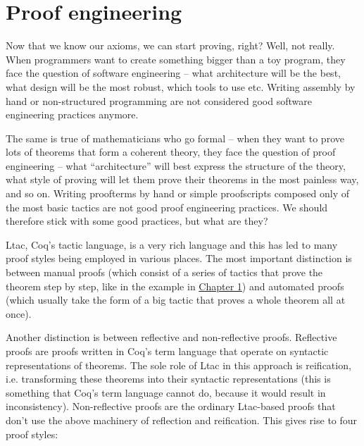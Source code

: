 \documentclass[declaration,inz,english,shortabstract]{iithesis}
\begin{document}
\section{Proof engineering}

Now that we know our axioms, we can start proving, right? Well, not really. When programmers want to create something bigger than a toy program, they face the question of software engineering -- what architecture will be the best, what design will be the most robust, which tools to use etc. Writing assembly by hand or non-structured programming are not considered good software engineering practices anymore.

The same is true of mathematicians who go formal -- when they want to prove lots of theorems that form a coherent theory, they face the question of proof engineering -- what ``architecture'' will best express the structure of the theory, what style of proving will let them prove their theorems in the most painless way, and so on. Writing proofterms by hand or simple proofscripts composed only of the most basic tactics are not good proof engineering practices. We should therefore stick with some good practices, but what are they?

Ltac, Coq's tactic language, is a very rich language and this has led to many proof styles being employed in various places. The most important distinction is between manual proofs (which consist of a series of tactics that prove the theorem step by step, like in the example in \hyperref[ch1]{Chapter 1}) and automated proofs (which usually take the form of a big tactic that proves a whole theorem all at once).

Another distinction is between reflective and non-reflective proofs. Reflective proofs are proofs written in Coq's term language that operate on syntactic representations of theorems. The sole role of Ltac in this approach is reification, i.e. transforming these theorems into their syntactic representations (this is something that Coq's term language cannot do, because it would result in inconsistency). Non-reflective proofs are the ordinary Ltac-based proofs that don't use the above machinery of reflection and reification. This gives rise to four proof styles:
\end{document}

